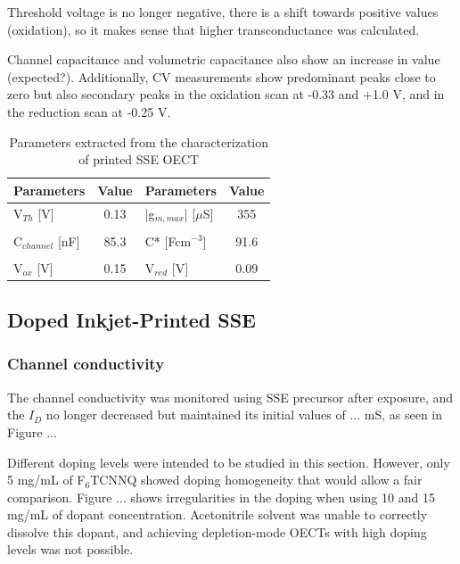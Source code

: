 Threshold voltage is no longer negative, there is a shift towards positive values (oxidation), so it makes sense that higher transconductance was calculated.

Channel capacitance and volumetric capacitance also show an increase in value (expected?). Additionally, CV measurements show predominant peaks close to zero but also secondary peaks in the oxidation scan at -0.33 and +1.0 V, and in the reduction scan at -0.25 V. 

\begin{table}[ht]
\centering
\caption{Parameters extracted from the characterization of printed SSE OECT}
\begin{tabular}{l|c||l|c}
Parameters & Value & Parameters & Value \\\hline \hline
V$_{Th}$ [V] &  0.13 & |g$_{m,max}$| [$\mu$S] & 355 \\
& & &\\[-1em]
C$_{channel}$ [nF] & 85.3 & C* [Fcm$^{-3}$] & 91.6 \\
& & &\\[-1em]
V$_{ox}$ [V] & 0.15 & V$_{red}$ [V] & 0.09 \\\hline
\hline
\end{tabular}
\label{tab:printedfom}
\end{table}

\subsection{Doped Inkjet-Printed SSE} \label{subsec:dopedOECTs}

\subsubsection{Channel conductivity}
The channel conductivity was monitored using SSE precursor after exposure, and the $I_{D}$ no longer decreased but maintained its initial values of ... mS, as seen in Figure ...

Different doping levels were intended to be studied in this section. However, only 5 mg/mL of F$_{6}$TCNNQ showed doping homogeneity that would allow a fair comparison. Figure ... shows irregularities in the doping when using 10 and 15 mg/mL of dopant concentration. Acetonitrile solvent was unable to correctly dissolve this dopant, and achieving depletion-mode OECTs with high doping levels was not possible.

